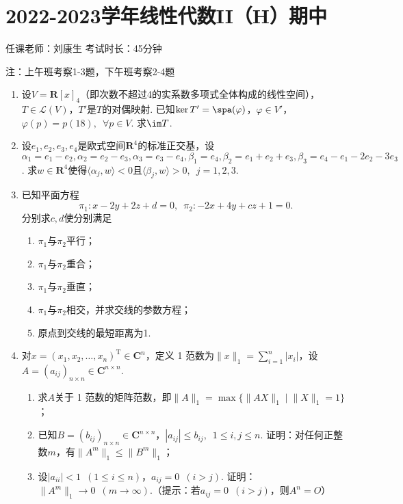 \section{2022-2023学年线性代数II（H）期中}

\begin{center}
    任课老师：刘康生\hspace{4em} 考试时长：45分钟

    注：上午班考察1-3题，下午班考察2-4题
\end{center}

\begin{enumerate}
    \item 设$V=\mathbf{R}[x]_4$（即次数不超过4的实系数多项式全体构成的线性空间），$T\in\mathcal{L}(V)$，$T'$是$T$的对偶映射. 已知$\ker T'=\spa(\varphi)$，$\varphi\in V'$，$\varphi(p)=p(18),\enspace\forall p\in V$. 求$\im T$.
	\item 设$e_1,e_2,e_3,e_4$是欧式空间$\mathbf{R}^4$的标准正交基，设$\alpha_1=e_1-e_2,\alpha_2=e_2-e_3,\alpha_3=e_3-e_4,\beta_1=e_4,\beta_2=e_1+e_2+e_3,\beta_3=e_4-e_1-2e_2-3e_3$. 求$w\in\mathbf{R}^4$使得$\langle\alpha_j,w\rangle<0$且$\langle\beta_j,w\rangle>0,\enspace j=1,2,3$.
	\item 已知平面方程
    \[\pi_1\colon x-2y+2z+d=0,\enspace \pi_2\colon -2x+4y+cz+1=0.\]
    分别求$c,d$使分别满足
    \begin{enumerate}
        \item $\pi_1$与$\pi_2$平行；

        \item $\pi_1$与$\pi_2$重合；

        \item $\pi_1$与$\pi_2$垂直；

        \item $\pi_1$与$\pi_2$相交，并求交线的参数方程；

        \item 原点到交线的最短距离为1.
    \end{enumerate}
	\item 对$x=(x_1,x_2,\ldots,x_n)^\mathrm{T}\in\mathbf{C}^n$，定义 1 范数为$\lVert x \rVert_1=\sum\limits_{i=1}^n|x_i|$，设$A=(a_{ij})_{n\times n}\in\mathbf{C}^{n\times n}$.
	\begin{enumerate}
        \item 求$A$关于 1 范数的矩阵范数，即$\lVert A \rVert_1=\max\{\lVert AX \rVert_1\mid \lVert X \rVert_1=1\}$；

        \item 已知$B=(b_{ij})_{n\times n}\in\mathbf{C}^{n\times n}$，$|a_{ij}|\leqslant b_{ij},\enspace 1\leqslant i,j\leqslant n$. 证明：对任何正整数$m$，有$\lVert A^m \rVert_1\leqslant\lVert B^m \rVert_1$；

        \item 设$|a_{ii}|<1\enspace(1\leqslant i\leqslant n)$，$a_{ij}=0\enspace(i>j)$. 证明：$\lVert A^m \rVert_1\to 0\enspace(m\to\infty)$.（提示：若$a_{ij}=0\enspace(i>j)$，则$A^n=O$）
    \end{enumerate}
\end{enumerate}

\clearpage
